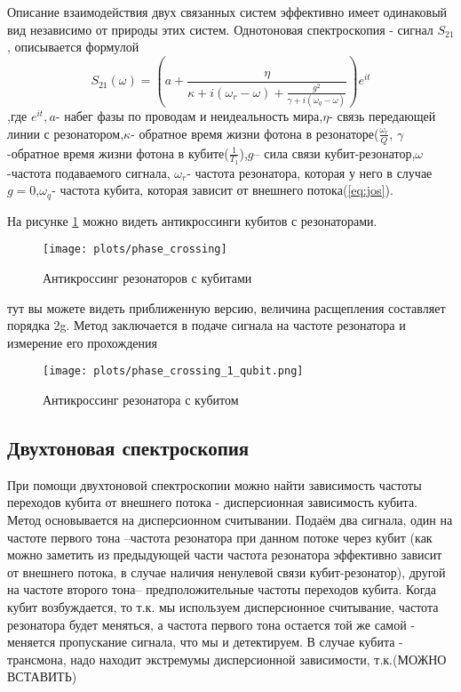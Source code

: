 \documentclass[12pt, twoside]{report}
\begin{document}
Описание взаимодействия двух связанных систем эффективно имеет одинаковый вид независимо от природы этих систем\cite{Novotny2010}. Однотоновая спектроскопия - сигнал $S_{21}$, описывается формулой 
\begin{equation}
S_{21}(\omega)=(a+\frac{\eta}{\kappa+i(\omega_r-\omega)+\frac{g^2}
{\gamma+i(\omega_q-\omega)}})e^{it}
\end{equation}
,где $e^{it},a$- набег фазы по проводам и неидеальность мира,$\eta$- связь передающей линии с резонатором,$\kappa$- обратное время жизни фотона в резонаторе($\frac{\omega_r}{Q}$, $\gamma$-обратное время жизни фотона в кубите($\frac{1}{T_1}$),$g$-- сила связи кубит-резонатор,$\omega$-частота подаваемого сигнала, $\omega_r$- частота резонатора, которая у него в случае $g=0$,$\omega_q$- частота кубита, которая зависит от внешнего потока(\ref{eq:jos}).  




\newpage
На рисунке \ref{fig:anticrossings} можно видеть антикроссинги кубитов с резонаторами.

\begin{figure}[H]
		\begin{center}
\texttt{[image: plots/phase\_crossing]}
\caption{Антикроссинг резонаторов с кубитами}
		\end{center}
		\label{fig:anticrossings}
	\end{figure}
	
тут вы можете видеть приближенную версию, величина расщепления составляет порядка 2g.
Метод заключается в подаче сигнала на частоте резонатора и измерение его прохождения
\begin{figure}[H]
		\begin{center}
\texttt{[image: plots/phase\_crossing\_1\_qubit.png]}
\caption{Антикроссинг резонатора с кубитом}
		\end{center}
	\end{figure}
	\label{fig:anticrossings}

	
\newpage
		\subsection{Двухтоновая спектроскопия}
При помощи двухтоновой спектроскопии можно найти зависимость частоты переходов кубита от внешнего потока - дисперсионная зависимость кубита. Метод основывается на дисперсионном считывании. Подаём два сигнала, один на частоте первого тона --частота резонатора при данном потоке через кубит (как можно заметить из предыдующей части частота резонатора эффективно зависит от внешнего потока, в случае наличия ненулевой связи кубит-резонатор), другой на частоте второго тона-- предположительные частоты переходов кубита. Когда кубит возбуждается, то т.к. мы используем дисперсионное считывание, частота резонатора будет меняться, а частота первого тона остается той же самой - меняется пропускание сигнала, что мы и детектируем. В случае кубита - трансмона, надо находит экстремумы дисперсионной зависимости, т.к.(МОЖНО ВСТАВИТЬ)
		
\end{document}
